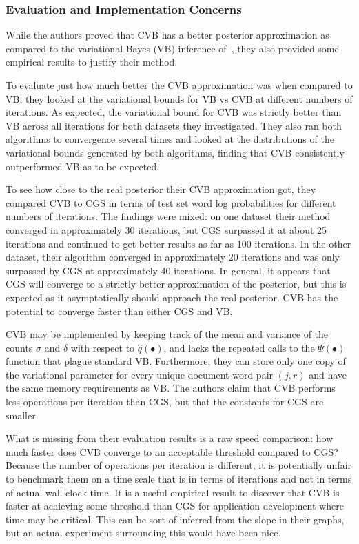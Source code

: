 \documentclass[11pt]{article}
\begin{document}
\subsubsection{Evaluation and Implementation Concerns}

While the authors proved that CVB has a better posterior approximation as
compared to the variational Bayes (VB) inference of~\cite{Blei:2003:LDA},
they also provided some empirical results to justify their method.

To evaluate just how much better the CVB approximation was when
compared to VB, they looked at the variational bounds for VB vs CVB at
different numbers of iterations. As expected, the variational bound for CVB
was strictly better than VB across all iterations for both datasets they
investigated. They also ran both algorithms to convergence several times
and looked at the distributions of the variational bounds generated by both
algorithms, finding that CVB consistently outperformed VB as to be
expected.

To see how close to the real posterior their CVB approximation got, they
compared CVB to CGS in terms of test set word log probabilities for
different numbers of iterations. The findings were mixed: on one dataset
their method converged in approximately 30 iterations, but CGS surpassed it
at about 25 iterations and continued to get better results as far as 100
iterations. In the other dataset, their algorithm converged in
approximately 20 iterations and was only surpassed by CGS at approximately
40 iterations. In general, it appears that CGS will converge to a strictly
better approximation of the posterior, but this is expected as it
asymptotically should approach the real posterior. CVB has the potential to
converge faster than either CGS and VB.

CVB may be implemented by keeping track of the mean and variance of the
counts $\sigma$ and $\delta$ with respect to $\hat{q}(\bullet)$, and lacks
the repeated calls to the $\Psi(\bullet)$ function that plague standard VB.
Furthermore, they can store only one copy of the variational parameter for
every unique document-word pair $(j,r)$ and have the same memory
requirements as VB. The authors claim that CVB performs less operations per
iteration than CGS, but that the constants for CGS are smaller.

What is missing from their evaluation results is a raw speed comparison:
how much faster does CVB converge to an acceptable threshold compared to
CGS? Because the number of operations per iteration is different, it is
potentially unfair to benchmark them on a time scale that is in terms of
iterations and not in terms of actual wall-clock time. It is a useful
empirical result to discover that CVB is faster at achieving some threshold
than CGS for application development where time may be critical.  This can
be sort-of inferred from the slope in their graphs, but an actual
experiment surrounding this would have been nice.
\end{document}
